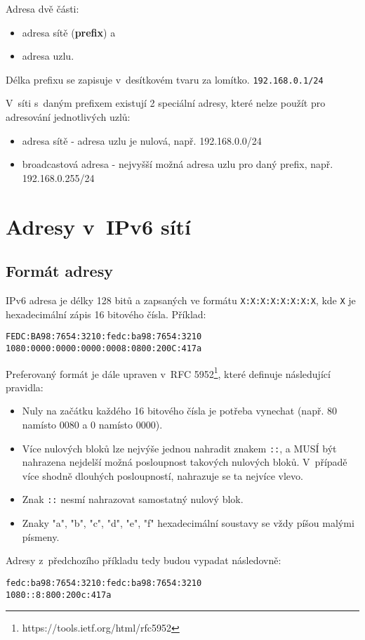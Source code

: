Adresa dvě části:
\begin{itemize}
    \item adresa sítě ({\bf prefix}) a
    \item adresa uzlu.
\end{itemize}
Délka prefixu se zapisuje v~desítkovém tvaru za lomítko. {\tt 192.168.0.1/24}

V~síti s~daným prefixem existují 2 speciální adresy, které nelze použít pro
adresování jednotlivých uzlů:
\begin{itemize}
    \item adresa sítě - adresa uzlu je nulová, např. 192.168.0.0/24
    \item broadcastová adresa - nejvyšší možná adresa uzlu pro daný prefix,
        např. 192.168.0.255/24
\end{itemize}

\section{Adresy v~IPv6 sítí}\label{adresy_ipv6}

\subsection{Formát adresy}
IPv6 adresa je délky 128 bitů a zapsaných ve formátu {\tt X:X:X:X:X:X:X:X}, kde
{\tt X} je hexadecimální zápis 16 bitového čísla.
Příklad:\\
\begin{verbatim}
FEDC:BA98:7654:3210:fedc:ba98:7654:3210
1080:0000:0000:0000:0008:0800:200C:417a
\end{verbatim}

Preferovaný formát je dále upraven v~RFC 5952\footnote{https://tools.ietf.org/html/rfc5952}, které definuje následující
pravidla:
\begin{itemize}
    \item Nuly na začátku každého 16 bitového čísla je potřeba vynechat (např.
        80 namísto 0080 a 0 namísto 0000).
    \item Více nulových bloků lze nejvýše jednou nahradit znakem {\tt ::}, a
        MUSÍ být nahrazena nejdelší možná posloupnost takových nulových bloků.
        V~případě více shodně dlouhých posloupností, nahrazuje se ta nejvíce
        vlevo.
    \item Znak {\tt ::} nesmí nahrazovat samostatný nulový blok.
    \item Znaky "a", "b", "c", "d", "e", "f" hexadecimální soustavy se vždy
        píšou malými písmeny.
\end{itemize}
Adresy z~předchozího příkladu tedy budou vypadat následovně:\\
\begin{verbatim}
fedc:ba98:7654:3210:fedc:ba98:7654:3210
1080::8:800:200c:417a
\end{verbatim}

